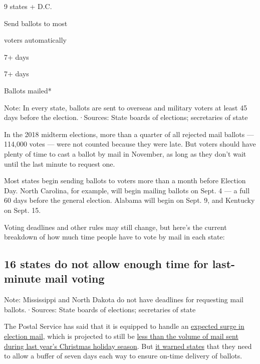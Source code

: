 9 states + D.C.

Send ballots to most

voters automatically

7+ days

7+ days

Ballots mailed*

Note: In every state, ballots are sent to overseas and military voters
at least 45 days before the election.·Sources: State boards of
elections; secretaries of state

In the 2018 midterm elections, more than a quarter of all rejected mail
ballots --- 114,000 votes --- were not counted because they were late.
But voters should have plenty of time to cast a ballot by mail in
November, as long as they don't wait until the last minute to request
one.

Most states begin sending ballots to voters more than a month before
Election Day. North Carolina, for example, will begin mailing ballots on
Sept. 4 --- a full 60 days before the general election. Alabama will
begin on Sept. 9, and Kentucky on Sept. 15.

Voting deadlines and other rules may still change, but here's the
current breakdown of how much time people have to vote by mail in each
state:

\hypertarget{16-states-do-not-allow-enough-time-for-last-minute-mail-voting}{%
\subsection{\texorpdfstring{16 states \textbf{do not allow enough time}
for last-minute mail
voting}{16 states do not allow enough time for last-minute mail voting}}\label{16-states-do-not-allow-enough-time-for-last-minute-mail-voting}}

Note: Mississippi and North Dakota do not have deadlines for requesting
mail ballots.·Sources: State boards of elections; secretaries of state

The Postal Service has said that it is equipped to handle an
\href{https://www.nytimes3xbfgragh.onion/interactive/2020/08/11/us/politics/vote-by-mail-us-states.html}{expected
surge in election mail}, which is projected to still be
\href{https://www.nytimes3xbfgragh.onion/interactive/2020/08/20/upshot/coronavirus-election-mail-volume.html}{less
than the volume of mail sent during last year's Christmas holiday
season}. But
\href{https://www.nytimes3xbfgragh.onion/2020/08/14/us/politics/usps-vote-mail.html}{it
warned states} that they need to allow a buffer of seven days each way
to ensure on-time delivery of ballots.

